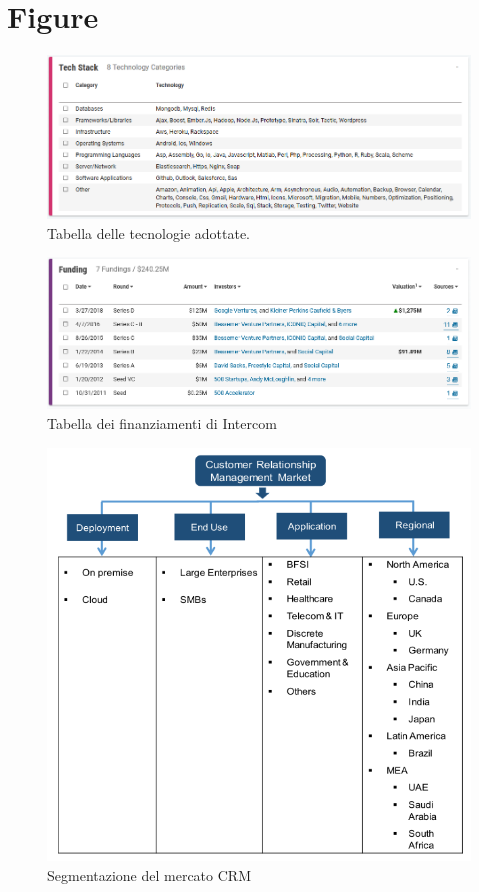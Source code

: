 \documentclass[a4paper, 11pt]{article}
\begin{document}
\section*{Figure}
\null
\vfill
\begin{figure}[h]
\includegraphics[width=\textwidth]{images/intercomTech.PNG}
\caption{Tabella delle tecnologie adottate.}
\label{fig:tecnologie}
\end{figure}
\begin{figure}[h]
\includegraphics[width=\textwidth]{images/intercomFundings.PNG}
\caption{Tabella dei finanziamenti di Intercom}
\label{fig:investimenti}
\end{figure}
\vfill

\newpage
\null
\vfill
\begin{figure}[h]
\includegraphics[width=\textwidth]{images/CRMmarketsegmentation.PNG}
\caption{Segmentazione del mercato CRM  \cite{GVR}}
\label{fig:segmentationintercom}
\end{figure}
\vfill
\end{document}

